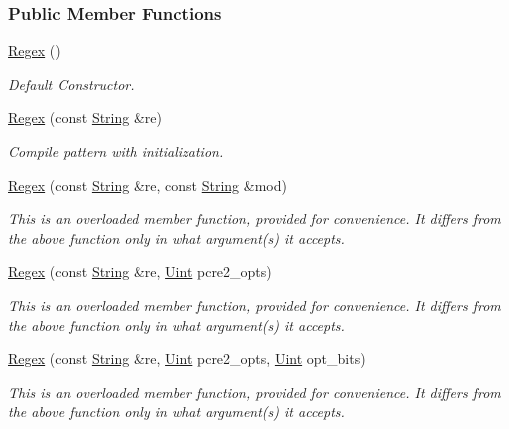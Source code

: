 \subsubsection*{Public Member Functions}
\begin{DoxyCompactItemize}
\item 
\hyperlink{classjpcre2_1_1Regex_a302f65cd5747c5d34570ca76516ab715}{Regex} ()
\begin{DoxyCompactList}\small\item\em Default Constructor. \end{DoxyCompactList}\item 
\hyperlink{classjpcre2_1_1Regex_a4d959fdc32791bee6d819abfc44af51a}{Regex} (const \hyperlink{namespacejpcre2_a91f03070152fb228bc116c5a737f1d16}{String} \&re)
\begin{DoxyCompactList}\small\item\em Compile pattern with initialization. \end{DoxyCompactList}\item 
\hyperlink{classjpcre2_1_1Regex_a58be9b4e1eaec2a43586af45c6ae5549}{Regex} (const \hyperlink{namespacejpcre2_a91f03070152fb228bc116c5a737f1d16}{String} \&re, const \hyperlink{namespacejpcre2_a91f03070152fb228bc116c5a737f1d16}{String} \&mod)
\begin{DoxyCompactList}\small\item\em This is an overloaded member function, provided for convenience. It differs from the above function only in what argument(s) it accepts. \end{DoxyCompactList}\item 
\hyperlink{classjpcre2_1_1Regex_a8f8a1eabf09292b782a6f33287e3fee4}{Regex} (const \hyperlink{namespacejpcre2_a91f03070152fb228bc116c5a737f1d16}{String} \&re, \hyperlink{namespacejpcre2_a078242d38221a13fb3543b9edd78c099}{Uint} pcre2\+\_\+opts)
\begin{DoxyCompactList}\small\item\em This is an overloaded member function, provided for convenience. It differs from the above function only in what argument(s) it accepts. \end{DoxyCompactList}\item 
\hyperlink{classjpcre2_1_1Regex_abe210e2ca6cfcef11760875930cf069d}{Regex} (const \hyperlink{namespacejpcre2_a91f03070152fb228bc116c5a737f1d16}{String} \&re, \hyperlink{namespacejpcre2_a078242d38221a13fb3543b9edd78c099}{Uint} pcre2\+\_\+opts, \hyperlink{namespacejpcre2_a078242d38221a13fb3543b9edd78c099}{Uint} opt\+\_\+bits)
\begin{DoxyCompactList}\small\item\em This is an overloaded member function, provided for convenience. It differs from the above function only in what argument(s) it accepts. \end{DoxyCompactList}\item 

\end{DoxyCompactItemize}
